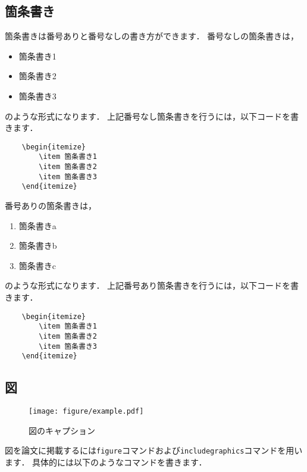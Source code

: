 \subsection{箇条書き}
箇条書きは番号ありと番号なしの書き方ができます．
番号なしの箇条書きは，
\begin{itemize}
\item 箇条書き1
\item 箇条書き2
\item 箇条書き3
\end{itemize}
のような形式になります．
上記番号なし箇条書きを行うには，以下コードを書きます．
\begin{verbatim}
    \begin{itemize}
        \item 箇条書き1
        \item 箇条書き2
        \item 箇条書き3
    \end{itemize}
\end{verbatim}

番号ありの箇条書きは，
\begin{enumerate}
\item 箇条書きa
\item 箇条書きb
\item 箇条書きc
\end{enumerate}
のような形式になります．
上記番号あり箇条書きを行うには，以下コードを書きます．
\begin{verbatim}
    \begin{itemize}
        \item 箇条書き1
        \item 箇条書き2
        \item 箇条書き3
    \end{itemize}
\end{verbatim}


\subsection{図}

\begin{figure*}[tb]
\begin{center}
\texttt{[image: figure/example.pdf]}
\caption{図のキャプション}
\label{fig:example}
\end{center}
\end{figure*}

図を論文に掲載するには{\tt figure}コマンドおよび{\tt includegraphics}コマンドを用います．
具体的には以下のようなコマンドを書きます．

